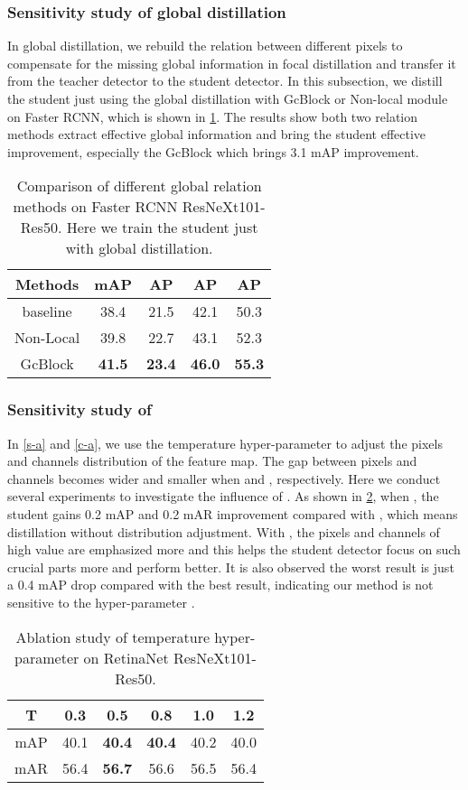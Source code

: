 \documentclass[10pt,twocolumn,letterpaper]{article}
\begin{document}
\subsubsection{Sensitivity study of global distillation}
In global distillation, we rebuild the relation between different pixels to compensate for the missing global information in focal distillation and transfer it from the teacher detector to the student detector. In this subsection, we distill the student just using the global distillation with GcBlock\cite{cao2019gcnet} or Non-local module\cite{wang2018non} on Faster RCNN, which is shown in \cref{table:relation methods}. The results show both two relation methods extract effective global information and bring the student effective improvement, especially the GcBlock which brings 3.1 mAP improvement.
\begin{table}
  \centering
  \begin{tabular}{@{}c|cccc}
    \toprule
    Methods & mAP& AP&AP&AP\\
    \midrule
    baseline  &38.4&21.5&42.1&50.3\\
    Non-Local  &39.8 &22.7&43.1&52.3\\
    GcBlock  &{\bf41.5}&{\bf23.4}&{\bf46.0}&{\bf55.3}\\
    \bottomrule
  \end{tabular}
  \caption{Comparison of different global relation methods on Faster RCNN ResNeXt101-Res50. Here we train the student just with global distillation.}
  \label{table:relation methods}
\end{table}

\subsubsection{Sensitivity study of  }
In \cref{s-a} and \cref{c-a}, we use the temperature hyper-parameter  to adjust the pixels and channels distribution of the feature map. The gap between pixels and channels becomes wider and smaller when  and , respectively.  Here we conduct several experiments to investigate the influence of . As shown in \cref{table:T ablation}, when , the student gains 0.2 mAP and 0.2 mAR improvement compared with , which means distillation without distribution adjustment. With , the pixels and channels of high value are emphasized more and this helps the student detector focus on such crucial parts more and perform better. It is also observed the worst result is just a 0.4 mAP drop compared with the best result, indicating our method is not sensitive to the hyper-parameter .
\begin{table}
  \centering
  \begin{tabular}{@{}c|ccccc}
    \toprule
    T & 0.3 & 0.5 & 0.8 & 1.0 & 1.2\\
    \midrule
    mAP  &40.1&{\bf40.4}&{\bf40.4}&40.2&40.0\\
    mAR  &56.4&{\bf56.7}&56.6&56.5&56.4\\
    \bottomrule
  \end{tabular}
  \caption{Ablation study of temperature hyper-parameter  on RetinaNet ResNeXt101-Res50.}
  \label{table:T ablation}
\end{table}
\end{document}
